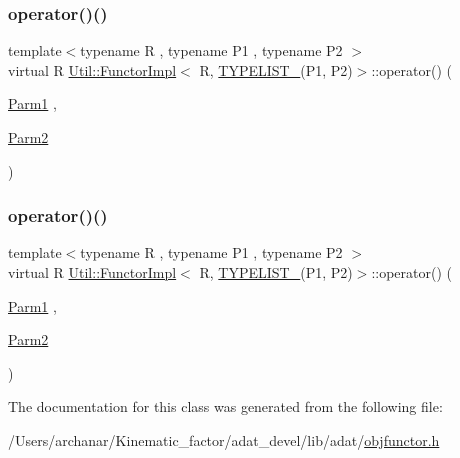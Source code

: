 \subsubsection{\texorpdfstring{operator()()}{operator()()}\hspace{0.1cm}{\footnotesize\ttfamily [1/2]}}
{\footnotesize\ttfamily template$<$typename R , typename P1 , typename P2 $>$ \\
virtual R \mbox{\hyperlink{classUtil_1_1FunctorImpl}{Util\+::\+Functor\+Impl}}$<$ R, \mbox{\hyperlink{install_2include_2adat_2typelist_8h_a311cb99af993804c6737ae46c5cbfaff}{T\+Y\+P\+E\+L\+I\+S\+T\+\_}}(P1, P2)$>$\+::operator() (\begin{DoxyParamCaption}\item[{\mbox{\hyperlink{structUtil_1_1Private_1_1FunctorImplBase_a9d61e693d6c616dea5bd9d9073c7d21a}{Parm1}}}]{,  }\item[{\mbox{\hyperlink{structUtil_1_1Private_1_1FunctorImplBase_a554085cd798ef14838a59b528f0feb2e}{Parm2}}}]{ }\end{DoxyParamCaption})\hspace{0.3cm}{\ttfamily [pure virtual]}}

\mbox{\label{classUtil_1_1FunctorImpl_3_01R_00_01TYPELIST__2_07P1_00_01P2_08_4_a5c9378116c2036cb377d239c8d454375}} 
\subsubsection{\texorpdfstring{operator()()}{operator()()}\hspace{0.1cm}{\footnotesize\ttfamily [2/2]}}
{\footnotesize\ttfamily template$<$typename R , typename P1 , typename P2 $>$ \\
virtual R \mbox{\hyperlink{classUtil_1_1FunctorImpl}{Util\+::\+Functor\+Impl}}$<$ R, \mbox{\hyperlink{install_2include_2adat_2typelist_8h_a311cb99af993804c6737ae46c5cbfaff}{T\+Y\+P\+E\+L\+I\+S\+T\+\_}}(P1, P2)$>$\+::operator() (\begin{DoxyParamCaption}\item[{\mbox{\hyperlink{structUtil_1_1Private_1_1FunctorImplBase_a9d61e693d6c616dea5bd9d9073c7d21a}{Parm1}}}]{,  }\item[{\mbox{\hyperlink{structUtil_1_1Private_1_1FunctorImplBase_a554085cd798ef14838a59b528f0feb2e}{Parm2}}}]{ }\end{DoxyParamCaption})\hspace{0.3cm}{\ttfamily [pure virtual]}}



The documentation for this class was generated from the following file\+:\begin{DoxyCompactItemize}
\item 
/\+Users/archanar/\+Kinematic\+\_\+factor/adat\+\_\+devel/lib/adat/\mbox{\hyperlink{lib_2adat_2objfunctor_8h}{objfunctor.\+h}}\end{DoxyCompactItemize}

